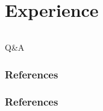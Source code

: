 \documentclass[compress]{beamer} %
\begin{document}
 \section{Experience}
  \begin{frame}
   {\Huge
     \vspace {0.15\textwidth}
     \begin{columns}
       \begin{column}{0.3\textwidth}
       \end{column}
       \begin{column}{0.3\textwidth}
       \end{column}
       \begin{column}{0.3\textwidth}
       \end{column}
     \end{columns}
   }
   \vspace {0.025\textwidth}
   \begin{center}
   {\huge Q\&A}
   \end{center}
 \end{frame}

\begin{frame}\frametitle{References}
\frametitle{References}


\end{frame}
\end{document}
